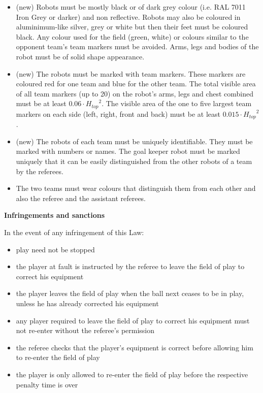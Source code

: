 \begin{itemize}
\item (new) Robots must be mostly black or of dark grey colour (i.e. RAL 7011 Iron Grey or darker) and non reflective. Robots may also be coloured in aluminimum-like silver, grey or white but then their feet must be coloured black. Any colour used for the field (green, white) or colours similar to the opponent team's team markers must be avoided. Arms, legs and bodies of the robot must be of solid shape appearance.
\item (new) The robots must be marked with team markers.
      These markers are coloured red for one team and blue for the other team.
      The total visible area of all team markers (up to 20) on the robot's arms,
      legs and chest combined must be at least $0.06\cdot {H_{top}}^2$.
      The visible area of the one to five largest team markers on each side
      (left, right, front and back) must be at least $0.015\cdot {H_{top}}^2$.
\item (new) The robots of each team must be uniquely identifiable. They must be marked with numbers or names. The goal keeper robot must be marked uniquely that it can be easily distinguished from the other robots of a team by the referees. 
\item The two teams must wear colours that distinguish them from each other and also the referee and the assistant referees.
\end{itemize}

\bigskip

{\bfseries Infringements and sanctions}

\headlinebox

In the event of any infringement of this Law:

\begin{itemize}
\item play need not be stopped
\item the player at fault is instructed by the referee to leave the field of play to correct his equipment
\item the player leaves the field of play when the ball next ceases to be in play, unless he has already corrected his equipment
\item any player required to leave the field of play to correct his equipment must not re-enter without the referee's permission
\item the referee checks that the player's equipment is correct before allowing him to re-enter the field of play 
\item the player is only allowed to re-enter the field of play before the respective penalty time is over 
\end{itemize}

